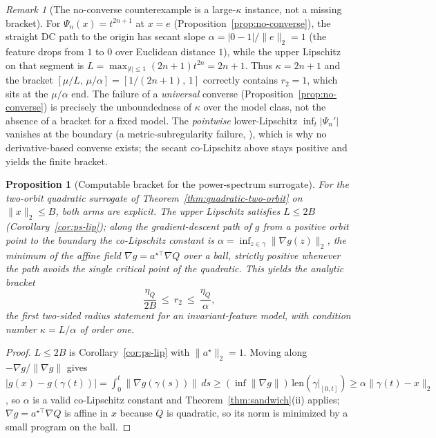 \documentclass[11pt]{article}
\theoremstyle{plain}
\newtheorem{proposition}{Proposition}
\theoremstyle{definition}
\theoremstyle{remark}
\newtheorem{remark}{Remark}
\begin{document}
\begin{remark}[The no-converse counterexample is a large-$\kappa$ instance, not a missing bracket]\label{rem:counter-kappa}
For $\Psi_n(x)=t^{2n+1}$ at $x=e$ (Proposition~\ref{prop:no-converse}), the straight DC path to the origin has secant slope $\alpha=|0-1|/\|e\|_2=1$ (the feature drops from $1$ to $0$ over Euclidean distance $1$), while the upper Lipschitz on that segment is $L=\max_{|t|\le1}(2n+1)t^{2n}=2n+1$.  Thus $\kappa=2n+1$ and the bracket $[\mu/L,\,\mu/\alpha]=[1/(2n+1),\,1]$ correctly contains $r_2=1$, which sits at the $\mu/\alpha$ end.  The failure of a \emph{universal} converse (Proposition~\ref{prop:no-converse}) is precisely the unboundedness of $\kappa$ over the model class, not the absence of a bracket for a fixed model.  The \emph{pointwise} lower-Lipschitz $\inf_t|\Psi_n'|$ vanishes at the boundary (a metric-subregularity failure, \citealp{DontchevRockafellar2009}), which is why no derivative-based converse exists; the secant co-Lipschitz above stays positive and yields the finite bracket.
\end{remark}

\begin{proposition}[Computable bracket for the power-spectrum surrogate]\label{prop:computable-bracket}
For the two-orbit quadratic surrogate of Theorem~\ref{thm:quadratic-two-orbit} on $\|x\|_2\le B$, both arms are explicit.  The upper Lipschitz satisfies $L\le 2B$ (Corollary~\ref{cor:ps-lip}); along the gradient-descent path of $g$ from a positive orbit point to the boundary the co-Lipschitz constant is $\alpha=\inf_{z\in\gamma}\|\nabla g(z)\|_2$, the minimum of the affine field $\nabla g=a^{\star\top}\nabla Q$ over a ball, strictly positive whenever the path avoids the single critical point of the quadratic.  This yields the analytic bracket
\[
\frac{\eta_Q}{2B}\ \le\ r_2\ \le\ \frac{\eta_Q}{\alpha},
\]
the first two-sided radius statement for an invariant-feature model, with condition number $\kappa=L/\alpha$ of order one.
\end{proposition}
\begin{proof}
$L\le2B$ is Corollary~\ref{cor:ps-lip} with $\|a^\star\|_2=1$.  Moving along $-\nabla g/\|\nabla g\|$ gives $|g(x)-g(\gamma(t))|=\int_0^t\|\nabla g(\gamma(s))\|\,ds\ge(\inf\|\nabla g\|)\,\mathrm{len}(\gamma|_{[0,t]})\ge\alpha\|\gamma(t)-x\|_2$, so $\alpha$ is a valid co-Lipschitz constant and Theorem~\ref{thm:sandwich}(ii) applies; $\nabla g=a^{\star\top}\nabla Q$ is affine in $x$ because $Q$ is quadratic, so its norm is minimized by a small program on the ball.
\end{proof}
\end{document}
